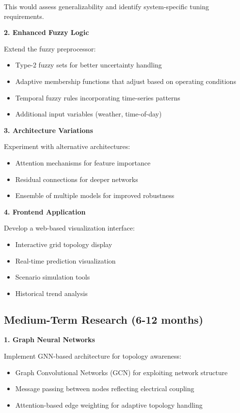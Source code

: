 \documentclass[12pt,a4paper]{report}
\begin{document}
This would assess generalizability and identify system-specific tuning requirements.

\textbf{2. Enhanced Fuzzy Logic}

Extend the fuzzy preprocessor:
\begin{itemize}
    \item Type-2 fuzzy sets for better uncertainty handling
    \item Adaptive membership functions that adjust based on operating conditions
    \item Temporal fuzzy rules incorporating time-series patterns
    \item Additional input variables (weather, time-of-day)
\end{itemize}

\textbf{3. Architecture Variations}

Experiment with alternative architectures:
\begin{itemize}
    \item Attention mechanisms for feature importance
    \item Residual connections for deeper networks
    \item Ensemble of multiple models for improved robustness
\end{itemize}

\textbf{4. Frontend Application}

Develop a web-based visualization interface:
\begin{itemize}
    \item Interactive grid topology display
    \item Real-time prediction visualization
    \item Scenario simulation tools
    \item Historical trend analysis
\end{itemize}

\subsection{Medium-Term Research (6-12 months)}

\textbf{1. Graph Neural Networks}

Implement GNN-based architecture for topology awareness:
\begin{itemize}
    \item Graph Convolutional Networks (GCN) for exploiting network structure
    \item Message passing between nodes reflecting electrical coupling
    \item Attention-based edge weighting for adaptive topology handling
\end{itemize}
\end{document}

